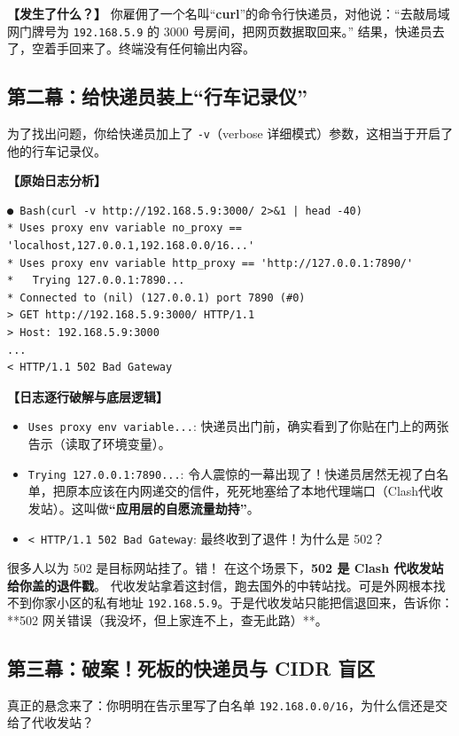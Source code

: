 \documentclass[12pt,a4paper]{ctexart}
\begin{document}
\textbf{【发生了什么？】}
你雇佣了一个名叫“\textbf{curl}”的命令行快递员，对他说：“去敲局域网门牌号为 \texttt{192.168.5.9} 的 3000 号房间，把网页数据取回来。”
结果，快递员去了，空着手回来了。终端没有任何输出内容。

\subsection{第二幕：给快递员装上“行车记录仪”}
为了找出问题，你给快递员加上了 \texttt{-v}（verbose 详细模式）参数，这相当于开启了他的行车记录仪。

\textbf{【原始日志分析】}
\begin{lstlisting}[style=terminal]
● Bash(curl -v http://192.168.5.9:3000/ 2>&1 | head -40)
* Uses proxy env variable no_proxy == 'localhost,127.0.0.1,192.168.0.0/16...'
* Uses proxy env variable http_proxy == 'http://127.0.0.1:7890/'
*   Trying 127.0.0.1:7890...
* Connected to (nil) (127.0.0.1) port 7890 (#0)
> GET http://192.168.5.9:3000/ HTTP/1.1
> Host: 192.168.5.9:3000
...
< HTTP/1.1 502 Bad Gateway
\end{lstlisting}

\newpage
\textbf{【日志逐行破解与底层逻辑】}
\begin{itemize}
    \item \texttt{Uses proxy env variable...}: 快递员出门前，确实看到了你贴在门上的两张告示（读取了环境变量）。
    \item \texttt{Trying 127.0.0.1:7890...}: 令人震惊的一幕出现了！快递员居然无视了白名单，把原本应该在内网递交的信件，死死地塞给了本地代理端口（Clash代收发站）。这叫做\textbf{“应用层的自愿流量劫持”}。
    \item \texttt{< HTTP/1.1 502 Bad Gateway}: 最终收到了退件！为什么是 502？
\end{itemize}

\begin{tcolorbox}[colback=purple!5,colframe=purple!75!black,title=深度原理：502 错误究竟是谁报的？,fonttitle=\bfseries,boxrule=0.5pt,arc=3mm]
很多人以为 502 是目标网站挂了。错！
在这个场景下，\textbf{502 是 Clash 代收发站给你盖的退件戳}。
代收发站拿着这封信，跑去国外的中转站找。可是外网根本找不到你家小区的私有地址 \texttt{192.168.5.9}。于是代收发站只能把信退回来，告诉你：**502 网关错误（我没坏，但上家连不上，查无此路）**。
\end{tcolorbox}

\subsection{第三幕：破案！死板的快递员与 CIDR 盲区}
真正的悬念来了：你明明在告示里写了白名单 \texttt{192.168.0.0/16}，为什么信还是交给了代收发站？
\end{document}
